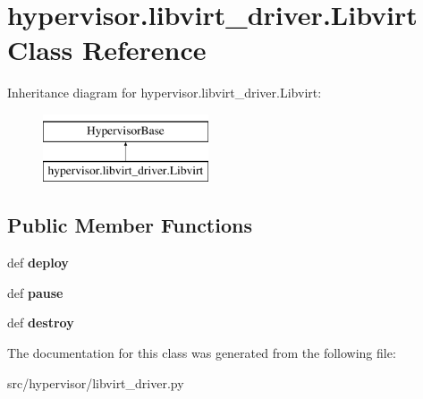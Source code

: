 \hypertarget{classhypervisor_1_1libvirt__driver_1_1Libvirt}{\section{hypervisor.\-libvirt\-\_\-driver.\-Libvirt Class Reference}
\label{classhypervisor_1_1libvirt__driver_1_1Libvirt}
}
Inheritance diagram for hypervisor.\-libvirt\-\_\-driver.\-Libvirt\-:\begin{figure}[H]
\begin{center}
\leavevmode
\includegraphics[height=2.000000cm]{classhypervisor_1_1libvirt__driver_1_1Libvirt}
\end{center}
\end{figure}
\subsection*{Public Member Functions}
\begin{DoxyCompactItemize}
\item 
\hypertarget{classhypervisor_1_1libvirt__driver_1_1Libvirt_ab8f6a87c28e570ecc55693e665b915fa}{def {\bfseries deploy}}\label{classhypervisor_1_1libvirt__driver_1_1Libvirt_ab8f6a87c28e570ecc55693e665b915fa}

\item 
\hypertarget{classhypervisor_1_1libvirt__driver_1_1Libvirt_ae82b6fcef27839a8db06edfb0857ee9e}{def {\bfseries pause}}\label{classhypervisor_1_1libvirt__driver_1_1Libvirt_ae82b6fcef27839a8db06edfb0857ee9e}

\item 
\hypertarget{classhypervisor_1_1libvirt__driver_1_1Libvirt_a48a5b9aa63f54fff5c4bcfd2dbdf104a}{def {\bfseries destroy}}\label{classhypervisor_1_1libvirt__driver_1_1Libvirt_a48a5b9aa63f54fff5c4bcfd2dbdf104a}

\end{DoxyCompactItemize}


The documentation for this class was generated from the following file\-:\begin{DoxyCompactItemize}
\item 
src/hypervisor/libvirt\-\_\-driver.\-py\end{DoxyCompactItemize}
